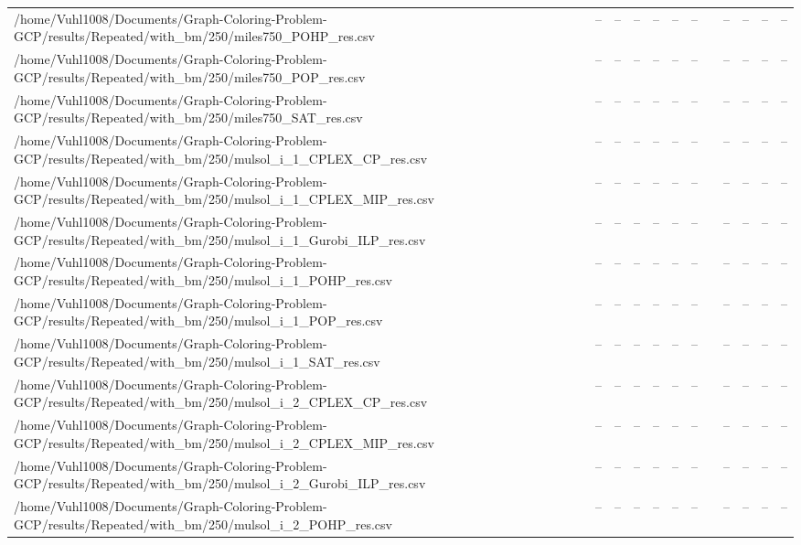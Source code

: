 \begin{table}[htbp]
\begin{tabular}{llllllllllll}
/home/Vuhl1008/Documents/Graph-Coloring-Problem-GCP/results/Repeated/with\_bm/250/miles750\_POHP\_res.csv & -- & -- & -- & -- & -- & -- & {} & -- & -- & -- & -- \\
/home/Vuhl1008/Documents/Graph-Coloring-Problem-GCP/results/Repeated/with\_bm/250/miles750\_POP\_res.csv & -- & -- & -- & -- & -- & -- & {} & -- & -- & -- & -- \\
/home/Vuhl1008/Documents/Graph-Coloring-Problem-GCP/results/Repeated/with\_bm/250/miles750\_SAT\_res.csv & -- & -- & -- & -- & -- & -- & {} & -- & -- & -- & -- \\
/home/Vuhl1008/Documents/Graph-Coloring-Problem-GCP/results/Repeated/with\_bm/250/mulsol\_i\_1\_CPLEX\_CP\_res.csv & -- & -- & -- & -- & -- & -- & {} & -- & -- & -- & -- \\
/home/Vuhl1008/Documents/Graph-Coloring-Problem-GCP/results/Repeated/with\_bm/250/mulsol\_i\_1\_CPLEX\_MIP\_res.csv & -- & -- & -- & -- & -- & -- & {} & -- & -- & -- & -- \\
/home/Vuhl1008/Documents/Graph-Coloring-Problem-GCP/results/Repeated/with\_bm/250/mulsol\_i\_1\_Gurobi\_ILP\_res.csv & -- & -- & -- & -- & -- & -- & {} & -- & -- & -- & -- \\
/home/Vuhl1008/Documents/Graph-Coloring-Problem-GCP/results/Repeated/with\_bm/250/mulsol\_i\_1\_POHP\_res.csv & -- & -- & -- & -- & -- & -- & {} & -- & -- & -- & -- \\
/home/Vuhl1008/Documents/Graph-Coloring-Problem-GCP/results/Repeated/with\_bm/250/mulsol\_i\_1\_POP\_res.csv & -- & -- & -- & -- & -- & -- & {} & -- & -- & -- & -- \\
/home/Vuhl1008/Documents/Graph-Coloring-Problem-GCP/results/Repeated/with\_bm/250/mulsol\_i\_1\_SAT\_res.csv & -- & -- & -- & -- & -- & -- & {} & -- & -- & -- & -- \\
/home/Vuhl1008/Documents/Graph-Coloring-Problem-GCP/results/Repeated/with\_bm/250/mulsol\_i\_2\_CPLEX\_CP\_res.csv & -- & -- & -- & -- & -- & -- & {} & -- & -- & -- & -- \\
/home/Vuhl1008/Documents/Graph-Coloring-Problem-GCP/results/Repeated/with\_bm/250/mulsol\_i\_2\_CPLEX\_MIP\_res.csv & -- & -- & -- & -- & -- & -- & {} & -- & -- & -- & -- \\
/home/Vuhl1008/Documents/Graph-Coloring-Problem-GCP/results/Repeated/with\_bm/250/mulsol\_i\_2\_Gurobi\_ILP\_res.csv & -- & -- & -- & -- & -- & -- & {} & -- & -- & -- & -- \\
/home/Vuhl1008/Documents/Graph-Coloring-Problem-GCP/results/Repeated/with\_bm/250/mulsol\_i\_2\_POHP\_res.csv & -- & -- & -- & -- & -- & -- & {} & -- & -- & -- & -- \\

\end{tabular}
\end{table}
